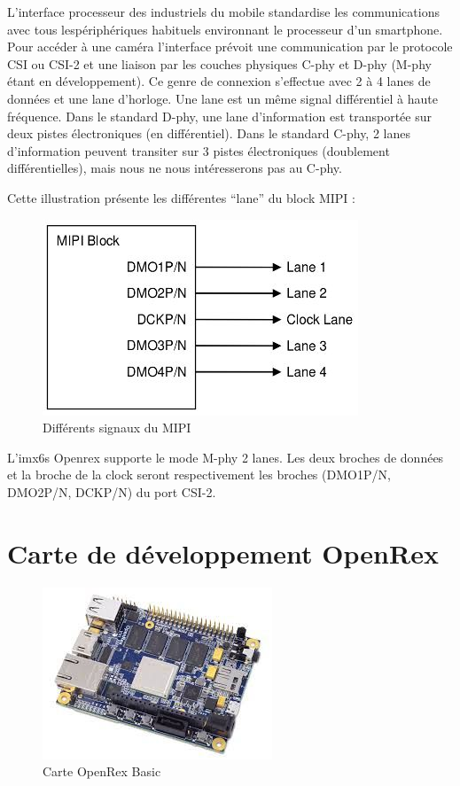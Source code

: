 L’interface processeur des industriels du mobile
standardise les communications avec tous lespériphériques habituels environnant le processeur d’un smartphone. Pour accéder à une
caméra l’interface prévoit une communication par le protocole CSI ou CSI-2 et une liaison
par les couches physiques C-phy et D-phy (M-phy étant en développement). Ce genre de
connexion s’effectue avec 2 à 4 lanes de données et une lane d’horloge. Une lane est un
même signal différentiel à haute fréquence. Dans le standard D-phy, une lane
d’information est transportée sur deux pistes électroniques (en différentiel). Dans le
standard C-phy, 2 lanes d’information peuvent transiter sur 3 pistes électroniques
(doublement différentielles), mais nous ne nous intéresserons pas au C-phy. \medskip

Cette illustration présente les différentes “lane” du block MIPI :

\begin{figure}[!htb]
    \centering
    \includegraphics[trim={0cm 0cm 0cm 0cm},clip,scale=0.4]{Figures/blockMIPI.png}
    \decoRule
    \caption{Différents signaux du MIPI} \label{fig:blockmipi}
\end{figure}

L’imx6s Openrex supporte le mode M-phy 2 lanes. Les deux broches de données et la
broche de la clock seront respectivement les broches (DMO1P/N, DMO2P/N, DCKP/N) du
port CSI-2.

\section{Carte de développement OpenRex}

\begin{figure}[!htb]
    \centering
    \includegraphics[trim={0cm 0cm 0cm 0cm},clip,scale=0.55]{Figures/openrex.png}
    \decoRule
    \caption{Carte OpenRex Basic} \label{fig:openrex}
\end{figure}

